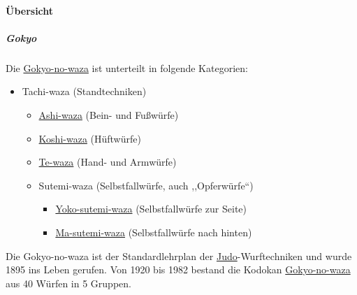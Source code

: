 \documentclass[justified, a4paper, notitlepage, captions=tableheading, nobib]{tufte-handout}
\begin{document}
\paragraph{Übersicht }
\label{sec:org41911c2}
\subparagraph{Gokyo}
\label{sec:orgd87657d}
Die \hyperref[org8ddb5b2]{Gokyo-no-waza} ist unterteilt in folgende Kategorien:

\begin{itemize}
\item \label{org33cf760}Tachi-waza (Standtechniken)
\begin{itemize}
\item \hyperref[org89f7763]{Ashi-waza} (Bein- und Fußwürfe)
\item \hyperref[org60c5854]{Koshi-waza} (Hüftwürfe)
\item \hyperref[org3eb21a0]{Te-waza} (Hand- und Armwürfe)
\item Sutemi-waza (Selbstfallwürfe, auch ,,Opferwürfe``)
\begin{itemize}
\item \hyperref[org3630628]{Yoko-sutemi-waza} (Selbstfallwürfe zur Seite)
\item \hyperref[org137e7ce]{Ma-sutemi-waza} (Selbstfallwürfe nach hinten)
\end{itemize}
\end{itemize}
\end{itemize}

Die \label{org8ddb5b2}Gokyo-no-waza ist der Standardlehrplan der \hyperref[org60aba15]{Judo}-Wurftechniken und wurde 1895 ins Leben gerufen. Von 1920 bis 1982 bestand die Kodokan \hyperref[org8ddb5b2]{Gokyo-no-waza} aus 40 Würfen in 5 Gruppen.
\end{document}
